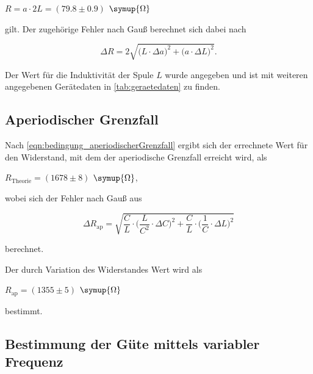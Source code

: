 \begin{center}
    $R = a \cdot 2L = (79.8 \pm 0.9)$ $\symup{\Omega}$
\end{center}

gilt. Der zugehörige Fehler nach Gauß berechnet sich dabei nach

\begin{equation}
    \Delta R = 2 \sqrt{ \bigg( L \cdot \Delta a \bigg)^2 + \bigg( a \cdot \Delta L \bigg)^2 }.
\end{equation}

Der Wert für die Induktivität der Spule $L$ wurde angegeben und ist mit weiteren angegebenen Gerätedaten in \autoref{tab:geraetedaten} zu finden.



\subsection{Aperiodischer Grenzfall}

Nach \eqref{eqn:bedingung_aperiodischerGrenzfall} ergibt sich der errechnete Wert für den Widerstand, mit dem der aperiodische Grenzfall erreicht wird, als

\begin{center}
    $R_\text{Theorie} = (1678 \pm 8)$ $\symup{\Omega}$,
\end{center}

wobei sich der Fehler nach Gauß aus %

\begin{equation}
    \Delta R_\text{ap} = \sqrt{ \frac{C}{L} \cdot \bigg( \frac{L}{C^2} \cdot \Delta C \bigg)^2 + \frac{C}{L} \cdot \bigg( \frac{1}{C} \cdot \Delta L \bigg)^2 }
\end{equation}

berechnet.

Der durch Variation des Widerstandes Wert wird als

\begin{center}
    $R_\text{ap} = (1355 \pm 5)$ $\symup{\Omega}$
\end{center}

bestimmt.

\subsection{Bestimmung der Güte mittels variabler Frequenz}

